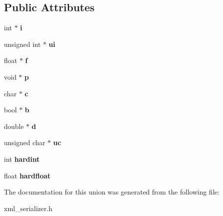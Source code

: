 \subsection*{Public Attributes}
\begin{DoxyCompactItemize}
\item 
int $\ast$ {\bfseries i}\hypertarget{unionXMLType_1_1wordlength_a0b137fb3f2ae85819c3e3c22d8bce67d}{}\label{unionXMLType_1_1wordlength_a0b137fb3f2ae85819c3e3c22d8bce67d}

\item 
unsigned int $\ast$ {\bfseries ui}\hypertarget{unionXMLType_1_1wordlength_a526411ed56eb4c2120b1c89b7882821d}{}\label{unionXMLType_1_1wordlength_a526411ed56eb4c2120b1c89b7882821d}

\item 
float $\ast$ {\bfseries f}\hypertarget{unionXMLType_1_1wordlength_aceade73df8c024e79af6101edf8e9e29}{}\label{unionXMLType_1_1wordlength_aceade73df8c024e79af6101edf8e9e29}

\item 
void $\ast$ {\bfseries p}\hypertarget{unionXMLType_1_1wordlength_a694c2d1e2f7409ab2bd064d9486d20d4}{}\label{unionXMLType_1_1wordlength_a694c2d1e2f7409ab2bd064d9486d20d4}

\item 
char $\ast$ {\bfseries c}\hypertarget{unionXMLType_1_1wordlength_a6aa9c31ce3e57842d05cd56a95c34c11}{}\label{unionXMLType_1_1wordlength_a6aa9c31ce3e57842d05cd56a95c34c11}

\item 
bool $\ast$ {\bfseries b}\hypertarget{unionXMLType_1_1wordlength_a07b24253517318fbc7612dcd101fe350}{}\label{unionXMLType_1_1wordlength_a07b24253517318fbc7612dcd101fe350}

\item 
double $\ast$ {\bfseries d}\hypertarget{unionXMLType_1_1wordlength_a3eeee9b8aff3fd157402e77212a02cd4}{}\label{unionXMLType_1_1wordlength_a3eeee9b8aff3fd157402e77212a02cd4}

\item 
unsigned char $\ast$ {\bfseries uc}\hypertarget{unionXMLType_1_1wordlength_ad68fdb081f86aad4da342816ed4e93b7}{}\label{unionXMLType_1_1wordlength_ad68fdb081f86aad4da342816ed4e93b7}

\item 
int {\bfseries hardint}\hypertarget{unionXMLType_1_1wordlength_a32fc42c2793bd5a335fef4aece0342d0}{}\label{unionXMLType_1_1wordlength_a32fc42c2793bd5a335fef4aece0342d0}

\item 
float {\bfseries hardfloat}\hypertarget{unionXMLType_1_1wordlength_a9515696095c8229c3082810387508a73}{}\label{unionXMLType_1_1wordlength_a9515696095c8229c3082810387508a73}

\end{DoxyCompactItemize}


The documentation for this union was generated from the following file\+:\begin{DoxyCompactItemize}
\item 
xml\+\_\+serializer.\+h\end{DoxyCompactItemize}
